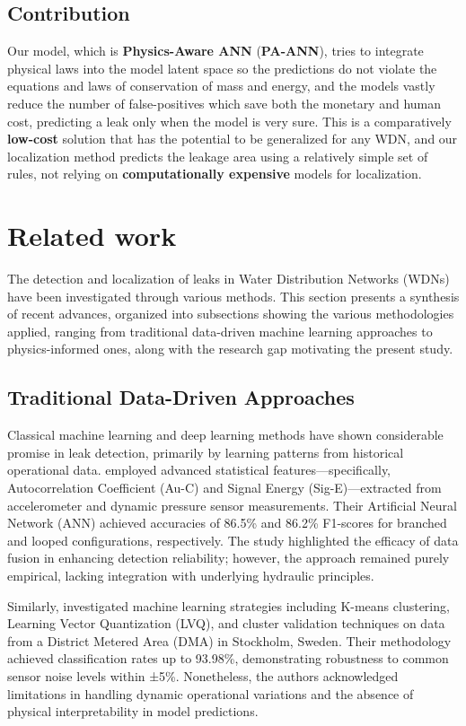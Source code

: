\documentclass[final,5p,times,twocolumn,authoryear]{elsarticle}
\begin{document}
\subsection{Contribution}
Our model, which is \textbf{Physics-Aware ANN} (\textbf{PA-ANN}), tries to integrate physical laws into the model latent space so the predictions do not violate the equations and laws of conservation of mass and energy, and the models vastly reduce the number of false-positives which save both the monetary and human cost, predicting a leak only when the model is very sure. This is a comparatively \textbf{low-cost} solution that has the potential to be generalized for any WDN, and our localization method predicts the leakage area using a relatively simple set of rules, not relying on \textbf{computationally expensive} models for localization.

\section{Related work}

The detection and localization of leaks in Water Distribution Networks (WDNs) have been
 investigated through various methods. This section presents a synthesis of recent advances, organized into subsections showing the various methodologies applied, ranging from traditional data-driven machine learning approaches to physics-informed ones, along with the research gap motivating the present study.

\subsection{Traditional Data-Driven Approaches}

Classical machine learning and deep learning methods have shown considerable promise in leak detection, primarily by learning patterns from historical operational data. \cite{MAHDI2024100685} employed advanced statistical features—specifically, Autocorrelation Coefficient (Au-C) and Signal Energy (Sig-E)—extracted from accelerometer and dynamic pressure sensor measurements. Their Artificial Neural Network (ANN) achieved accuracies of 86.5\% and 86.2\% F1-scores for branched and looped configurations, respectively. The study highlighted the efficacy of data fusion in enhancing detection reliability; however, the approach remained purely empirical, lacking integration with underlying hydraulic principles.

Similarly, \cite{sousa2023leakagedetection} investigated machine learning strategies including K-means clustering, Learning Vector Quantization (LVQ), and cluster validation techniques on data from a District Metered Area (DMA) in Stockholm, Sweden. Their methodology achieved classification rates up to 93.98\%, demonstrating robustness to common sensor noise levels within ±5\%. Nonetheless, the authors acknowledged limitations in handling dynamic operational variations and the absence of physical interpretability in model predictions.
\end{document}
